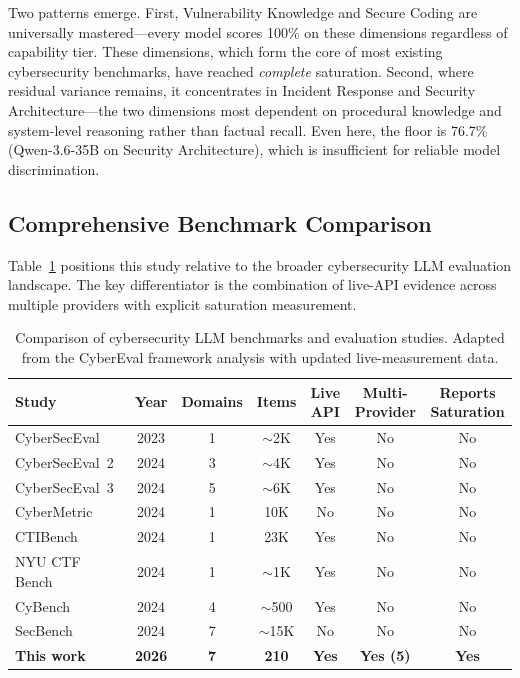 \documentclass[journal]{IEEEtran}
\begin{document}
Two patterns emerge. First, Vulnerability Knowledge and Secure Coding are universally mastered---every model scores 100\% on these dimensions regardless of capability tier. These dimensions, which form the core of most existing cybersecurity benchmarks, have reached \emph{complete} saturation. Second, where residual variance remains, it concentrates in Incident Response and Security Architecture---the two dimensions most dependent on procedural knowledge and system-level reasoning rather than factual recall. Even here, the floor is 76.7\% (Qwen-3.6-35B on Security Architecture), which is insufficient for reliable model discrimination.

\subsection{Comprehensive Benchmark Comparison}

Table~\ref{tab:benchmark_comparison} positions this study relative to the broader cybersecurity LLM evaluation landscape. The key differentiator is the combination of live-API evidence across multiple providers with explicit saturation measurement.

\begin{table}[t]
\centering
\caption{Comparison of cybersecurity LLM benchmarks and evaluation studies. Adapted from the CyberEval framework analysis with updated live-measurement data.}
\label{tab:benchmark_comparison}
\scriptsize
\begin{tabular}{lcccccc}
\toprule
\textbf{Study} & \textbf{Year} & \textbf{Domains} & \textbf{Items} & \textbf{Live API} & \textbf{Multi-Provider} & \textbf{Reports Saturation} \\
\midrule
CyberSecEval~\cite{bhatt2023cyberseceval} & 2023 & 1 & $\sim$2K & Yes & No & No \\
CyberSecEval~2~\cite{bhatt2024cyberseceval2} & 2024 & 3 & $\sim$4K & Yes & No & No \\
CyberSecEval~3~\cite{wan2024cyberseceval3} & 2024 & 5 & $\sim$6K & Yes & No & No \\
CyberMetric~\cite{tihanyi2024cybermetric} & 2024 & 1 & 10K & No & No & No \\
CTIBench~\cite{alam2024ctibench} & 2024 & 1 & 23K & Yes & No & No \\
NYU CTF Bench~\cite{shao2024nyuctf} & 2024 & 1 & $\sim$1K & Yes & No & No \\
CyBench~\cite{zhang2024cybench} & 2024 & 4 & $\sim$500 & Yes & No & No \\
SecBench~\cite{jing2024secbench} & 2024 & 7 & $\sim$15K & No & No & No \\
\midrule
\textbf{This work} & \textbf{2026} & \textbf{7} & \textbf{210} & \textbf{Yes} & \textbf{Yes (5)} & \textbf{Yes} \\
\bottomrule
\end{tabular}
\end{table}
\end{document}
